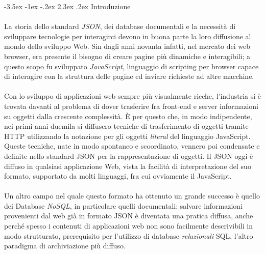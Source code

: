 \documentclass[a4paper, 12pt]{report}
\begin{document}

\graphicspath{ {./} }
\setlength{\parindent}{0em}
\setcounter{secnumdepth}{0}
\makeatletter
\renewcommand\section{\@startsection{section}{1}{\z@}%
                                   {-3.5ex \@plus -1ex \@minus -.2ex}%
                                   {2.3ex \@plus.2ex}%
                                   {\normalfont\large\bfseries\center}}
  \section{Introduzione}
    \paragraph*{}
      La storia dello standard \emph{JSON}, dei database documentali e la necessità di sviluppare tecnologie per interagirci devono in buona parte la loro diffusione al mondo dello sviluppo Web.
      Sin dagli anni novanta infatti, nel mercato dei web browser, era presente il bisogno di creare pagine più dinamiche e interagibili; a questo scopo fu sviluppato \emph{JavaScript}, linguaggio di scripting per browser capace di interagire con la struttura delle pagine ed inviare richieste ad altre macchine.
    \paragraph*{}
      Con lo sviluppo di applicazioni web sempre più visualmente ricche, l'industria si è trovata davanti al problema di dover trasferire fra front-end e server informazioni su oggetti dalla crescente complessità.
      È per questo che, in modo indipendente, nei primi anni duemila si diffusero tecniche di trasferimento di oggetti tramite HTTP utilizzando la notazione per gli oggetti \emph{literal} del linguaggio JavaScript.
      Queste tecniche, nate in modo spontaneo e scoordinato, vennero poi condensate e definite nello standard JSON per la rappresentazione di oggetti.
      Il JSON oggi è diffuso in qualsiasi applicazione Web, vista la facilità di interpretazione del suo formato, supportato da molti linguaggi, fra cui ovviamente il JavaScript.
      \paragraph*{}
      Un altro campo nel quale questo formato ha ottenuto un grande successo è quello dei Database \emph{NoSQL}, in particolare quelli documentali: salvare informazioni provenienti dal web già in formato JSON è diventata una pratica diffusa, anche perché spesso i contenuti di applicazioni web non sono facilmente descrivibili in modo strutturato, prerequisito per l'utilizzo di database \emph{relazionali} SQL, l'altro paradigma di archiviazione più diffuso.
\end{document}
